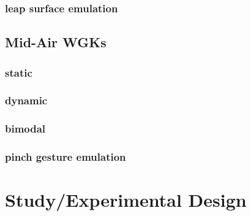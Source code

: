 \subsubsection{leap surface emulation}

\subsection{Mid-Air WGKs}

\subsubsection{static}

\subsubsection{dynamic}

\subsubsection{bimodal}

\subsubsection{pinch gesture emulation}

\section{Study/Experimental Design}
